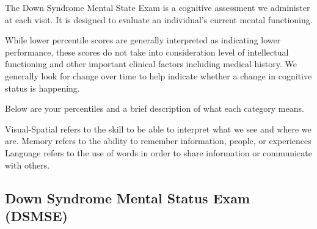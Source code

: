 The Down Syndrome Mental State Exam is a cognitive assessment we administer at each visit. It is designed to evaluate an individual’s current mental functioning. 

While lower percentile scores are generally interpreted as indicating lower performance, these scores do not take into consideration level of intellectual functioning and other important clinical factors including medical history. We generally look for change over time to help indicate whether a change in cognitive status is happening. 

Below are your percentiles and a brief description of what each category means. 

Visual-Spatial refers to the skill to be able to interpret what we see and where we are. 
Memory refers to the ability to remember information, people, or experiences
Language refers to the use of words in order to share information or communicate with others. 

\subsection{Down Syndrome Mental Status Exam (DSMSE)}